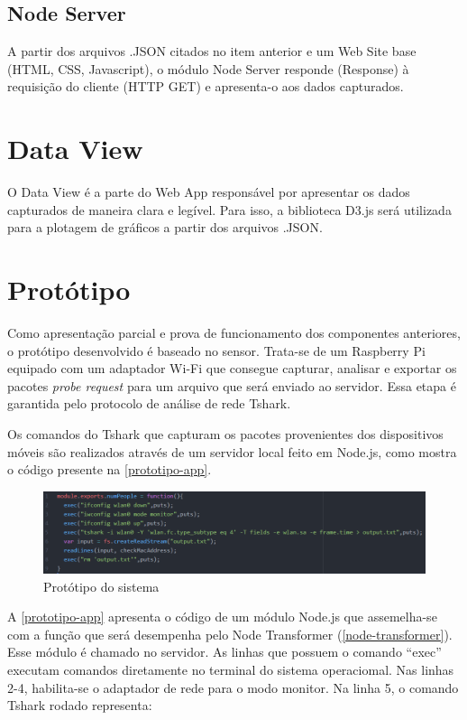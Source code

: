 \subsection{Node Server}
 A partir dos arquivos .JSON citados no item anterior e um Web Site base (HTML, CSS, Javascript), o módulo Node Server responde (Response) à requisição do cliente (HTTP GET) e apresenta-o aos dados capturados.

\section{Data View}
O Data View é a parte do Web App responsável por apresentar os dados capturados de maneira clara e legível. Para isso, a biblioteca D3.js \cite{D32017} será utilizada para a plotagem de gráficos a partir dos arquivos .JSON.

\section{Protótipo}
Como apresentação parcial e prova de funcionamento dos componentes anteriores, o protótipo desenvolvido é baseado no sensor.
Trata-se de um Raspberry Pi equipado com um adaptador Wi-Fi que consegue capturar, analisar e exportar os pacotes
\emph{probe request} para um arquivo que será enviado ao servidor. Essa etapa é garantida pelo protocolo de análise de rede
Tshark.

Os comandos do Tshark que capturam os pacotes provenientes dos dispositivos móveis são realizados através de um servidor local
feito em Node.js, como mostra o código presente na \autoref{prototipo-app}.

\begin{figure}[!h]
  \caption{\label{prototipo-app}Protótipo do sistema}
  \begin{center}
    \includegraphics[width=1.0\textwidth]{img/prototipo-app.png}
  \end{center}
\end{figure}

A \autoref{prototipo-app} apresenta o código de um módulo Node.js que assemelha-se com a função que será desempenha
pelo Node Transformer (\autoref{node-transformer}). Esse módulo é chamado no servidor. As linhas que possuem o comando ``exec'' executam comandos diretamente
no terminal do sistema operaciomal. Nas linhas 2-4, habilita-se o adaptador de rede para o modo monitor. Na linha 5,
o comando Tshark rodado representa:


